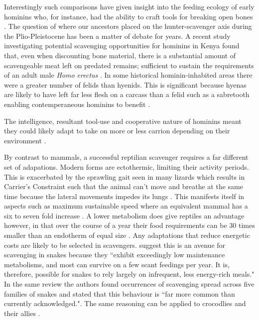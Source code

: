\documentclass[a4paper,12pt]{article}
\begin{document}
Interestingly such comparisons have given insight into the feeding ecology of early hominins who, for instance, had the ability to craft tools for breaking open bones \citep{ARCM:ARCM12084}.
The question of where our ancestors placed on the hunter-scavenger axis during the Plio-Pleistocene has been a matter of debate for years.
A recent study investigating potential scavenging opportunities for hominins in Kenya found that, even when discounting bone material, there is a substantial amount of scavengeable meat left on predated remains; sufficient to sustain the requirements of an adult male \textit{Homo erectus} \citep{pobiner2015new}.
In some historical hominin-inhabited areas there were a greater number of felids than hyenids.
This is significant because hyenas are likely to have left far less flesh on a carcass than a felid such as a sabretooth enabling contemperaneous hominins to benefit \citep{pobiner2015new}.

The intelligence, resultant tool-use and cooperative nature of hominins meant they could likely adapt to take on more or less carrion depending on their environment \citep{moleon2014humans}.


By contrast to mammals, a successful reptilian scavenger requires a far different set of adapations.
Modern forms are ectothermic, limiting their activity periods.
This is exacerbated by the sprawling gait seen in many lizards which results in Carrier's Constraint such that the animal can't move and breathe at the same time because the lateral movements impedes its lungs \citep{carrier1987evolution}.
This manifests itself in aspects such as maximum sustainable speed where an equivalent mammal has a six to seven fold increase \citep{ruben1995evolution}.
A lower metabolism does give reptiles an advantage however, in that over the course of a year their food requirements can be 30 times smaller than an endotherm of equal size \citep{Nagy1621}.
Any adaptations that reduce energetic costs are likely to be selected in scavengers.
\cite{devault2002scavenging} suggest this is an avenue for scavenging in snakes because they ``exhibit  exceedingly  low  maintenance  metabolisms,  and most  can  survive  on  a  few  scant  feedings per year.
It  is, therefore, possible for snakes to rely largely  on  infrequent,  less  energy-rich  meals." In the same review the authors found occurrences of scavenging spread across five families of snakes and stated that this behaviour is ``far more common than currently acknowledged."\citep{devault2002scavenging}.
The same reasoning can be applied to crocodlies and their allies \citep{forrest2003evidence}.
\end{document}

